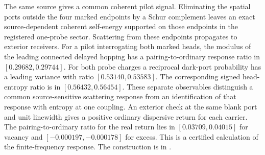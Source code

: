 \documentclass[11pt]{article}
\begin{document}
The same source gives a common coherent pilot signal. Eliminating
the spatial ports outside the four marked endpoints by a Schur
complement leaves an exact source-dependent coherent self-energy
supported on those endpoints in the registered one-probe sector.
Scattering from these endpoints propagates to exterior receivers.
For a pilot interrogating both marked heads, the modulus of the
leading connected delayed hopping has a pairing-to-ordinary response
ratio in $[0.29682,0.29744]$. For both probe charges a reciprocal
dark-port probability has a leading variance with ratio
$[0.53140,0.53583]$. The corresponding signed head-entropy ratio
is in $[0.56432,0.56454]$. These separate observables distinguish
a common source-sensitive scattering response from an identification
of that response with entropy at one coupling. An exterior check at the
same blank port and unit linewidth gives a positive ordinary dispersive
return for each carrier. The pairing-to-ordinary ratio for the real
return lies in $[0.03709,0.04015]$ for vacancy and
$[-0.000197,-0.000178]$ for excess. This is a certified calculation
of the finite-frequency response. The construction is
in .
\end{document}
